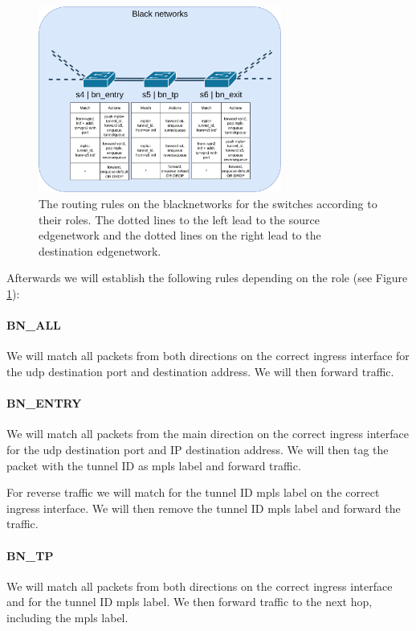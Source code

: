 \begin{figure}[ht]
    \centering
    \includegraphics[width=8cm]{images/chapter_6/routing_bn.png}
    \caption[Routing on the \gls{blacknetwork}s]{The routing rules on the \gls{blacknetwork}s for the switches according to their roles. The dotted lines to the left lead to the source \gls{edgenetwork} and the dotted lines on the right lead to the destination \gls{edgenetwork}.}
    \label{fig:routing_bn}
\end{figure}

Afterwards we will establish the following rules depending on the role (see Figure \ref{fig:routing_bn}):

\paragraph{BN\_ALL} We will match all packets from both directions on the correct ingress interface for the \acrshort{udp} destination port and destination address. We will then forward traffic.

\paragraph{BN\_ENTRY} We will match all packets from the main direction on the correct ingress interface for the \acrshort{udp} destination port and IP destination address. We will then tag the packet with the tunnel ID as \acrshort{mpls} label and forward traffic.

For reverse traffic we will match for the tunnel ID \acrshort{mpls} label on the correct ingress interface. We will then remove the tunnel ID \acrshort{mpls} label and forward the traffic.

\paragraph{BN\_TP} We will match all packets from both directions on the correct ingress interface and for the tunnel ID \acrshort{mpls} label. We then forward traffic to the next hop, including the \acrshort{mpls} label.

